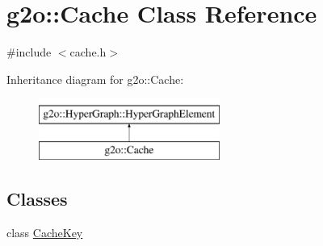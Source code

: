 \hypertarget{classg2o_1_1_cache}{}\section{g2o\+:\+:Cache Class Reference}
\label{classg2o_1_1_cache}


{\ttfamily \#include $<$cache.\+h$>$}

Inheritance diagram for g2o\+:\+:Cache\+:\begin{figure}[H]
\begin{center}
\leavevmode
\includegraphics[height=2.000000cm]{classg2o_1_1_cache}
\end{center}
\end{figure}
\subsection*{Classes}
\begin{DoxyCompactItemize}
\item 
class \mbox{\hyperlink{classg2o_1_1_cache_1_1_cache_key}{Cache\+Key}}
\end{DoxyCompactItemize}
